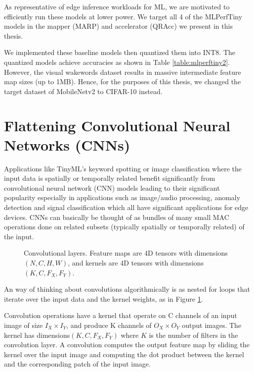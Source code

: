 As representative of edge inference workloads for ML, we are motivated to efficiently run these models at lower power. We target all 4 of the MLPerfTiny models in the mapper (MARP) and accelerator (QRAcc) we present in this thesis.

We implemented these baseline models then quantized them into INT8. The quantized models achieve accuracies as shown in Table \ref{table:mlperftiny2}. However, the visual wakewords dataset results in massive intermediate feature map sizes (up to 1MB). Hence, for the purposes of this thesis, we changed the target dataset of MobileNetv2 to CIFAR-10 instead.

\section{Flattening Convolutional Neural Networks (CNNs)}
\label{section:cnn_flattening}

Applications like TinyML's keyword spotting or image classification where the input data is spatially or temporally related benefit significantly from convolutional neural network (CNN) models leading to their significant popularity especially in applications such as image/audio processing, anomaly detection and signal classification which all have significant applications for edge devices. CNNs can basically be thought of as bundles of many small MAC operations done on related subsets (typically spatially or temporally related) of the input.

\begin{figure}[htbp]
    \centering
    
    \caption{Convolutional layers. Feature maps are 4D tensors with dimensions $(N,C,H,W)$, and kernels are 4D tensors with dimensions $(K,C,F_X,F_Y)$.}
    \label{fig:convolution_algorithm}
\end{figure}

An way of thinking about convolutions algorithmically is as nested for loops that iterate over the input data and the kernel weights, as in Figure \ref{fig:convolution_algorithm}.

Convolution operations have a kernel that operate on C channels of an input image of size $I_X\times I_Y$, and produce K channels of $O_X\times O_Y$ output images. The kernel has dimensions$(K,C,F_X,F_Y)$ where $K$ is the number of filters in the convolution layer. A convolution computes the output feature map by sliding the kernel over the input image and computing the dot product between the kernel and the corresponding patch of the input image.

